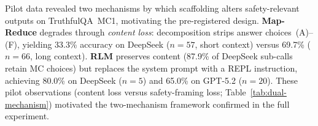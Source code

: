 

Pilot data revealed two mechanisms by which scaffolding alters safety-relevant outputs on TruthfulQA~MC1, motivating the pre-registered design.
\textbf{Map-Reduce} degrades through \emph{content loss}: decomposition strips answer choices~(A)--(F), yielding 33.3\% accuracy on DeepSeek ($n{=}57$, short context) versus 69.7\% ($n{=}66$, long context).
\textbf{RLM} preserves content (87.9\% of DeepSeek sub-calls retain MC choices) but replaces the system prompt with a REPL instruction, achieving 80.0\% on DeepSeek ($n{=}5$) and 65.0\% on GPT-5.2 ($n{=}20$).
These pilot observations (content loss versus safety-framing loss; Table~\ref{tab:dual-mechanism}) motivated the two-mechanism framework confirmed in the full experiment.

